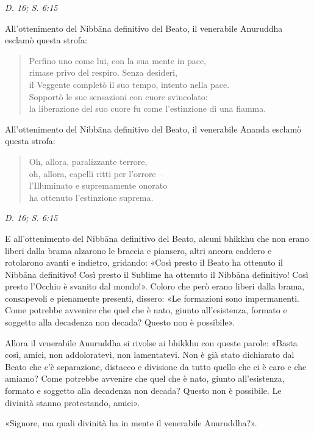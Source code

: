 \emph{D. 16; S. 6:15}


All’ottenimento del Nibbāna definitivo del Beato, il venerabile
Anuruddha esclamò questa strofa:


\begin{quotation}
Perfino uno come lui, con la sua mente in pace, \\
rimase privo del respiro. Senza desideri, \\
il Veggente completò il suo tempo, intento nella pace. \\
Sopportò le sue sensazioni con cuore svincolato: \\
la liberazione del suo cuore fu come l’estinzione di una fiamma.
\end{quotation}

All’ottenimento del Nibbāna definitivo del Beato, il venerabile Ānanda
esclamò questa strofa:


\begin{quotation}
Oh, allora, paralizzante terrore, \\
oh, allora, capelli ritti per l’orrore – \\
l’Illuminato e supremamente onorato \\
ha ottenuto l’estinzione suprema.
\end{quotation}

\emph{D. 16; S. 6:15}


E all’ottenimento del Nibbāna definitivo del Beato, alcuni bhikkhu che
non erano liberi dalla brama alzarono le braccia e piansero, altri
ancora caddero e rotolarono avanti e indietro, gridando: «Così presto il
Beato ha ottenuto il Nibbāna definitivo! Così presto il Sublime ha
ottenuto il Nibbāna definitivo! Così presto l’Occhio è svanito dal
mondo!». Coloro che però erano liberi dalla brama, consapevoli e
pienamente presenti, dissero: «Le formazioni sono impermanenti. Come
potrebbe avvenire che quel che è nato, giunto all’esistenza, formato e
soggetto alla decadenza non decada? Questo non è possibile».


Allora il venerabile Anuruddha si rivolse ai bhikkhu con queste parole:
«Basta così, amici, non addoloratevi, non lamentatevi. Non è già stato
dichiarato dal Beato che c’è separazione, distacco e divisione da tutto
quello che ci è caro e che amiamo? Come potrebbe avvenire che quel che è
nato, giunto all’esistenza, formato e soggetto alla decadenza non
decada? Questo non è possibile. Le divinità stanno protestando, amici».


«Signore, ma quali divinità ha in mente il venerabile Anuruddha?».


